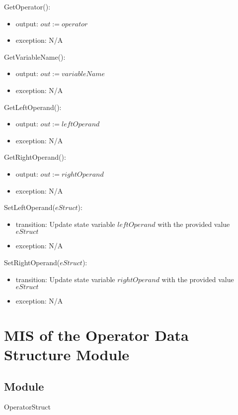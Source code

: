 \documentclass[12pt, titlepage]{article}
\begin{document}
\noindent GetOperator():
\begin{itemize}
	\item output: $out := operator$
	\item exception: N/A
\end{itemize}

\noindent GetVariableName():
\begin{itemize}
	\item output: $out := variableName$
	\item exception: N/A
\end{itemize}

\noindent GetLeftOperand():
\begin{itemize}
	\item output: $out := leftOperand$
	\item exception: N/A
\end{itemize}

\noindent GetRightOperand():
\begin{itemize}
	\item output: $out := rightOperand$
	\item exception: N/A
\end{itemize}

\noindent SetLeftOperand($eStruct$):
\begin{itemize}
	\item transition: Update state variable $leftOperand$ with the provided 
	value $eStruct$
	\item exception: N/A
\end{itemize}

\noindent SetRightOperand($eStruct$):
\begin{itemize}
	\item transition: Update state variable $rightOperand$ with the provided 
	value $eStruct$
	\item exception: N/A
\end{itemize}

\newpage

\section{MIS of the Operator Data Structure Module} 
\label{Module_operatordatastructure}

\subsection{Module}

OperatorStruct
\end{document}
